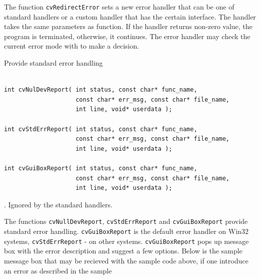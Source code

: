 \begin{description}
\end{description}

The function \texttt{cvRedirectError} sets a new error handler that
can be one of standard handlers or a custom handler
that has the certain interface. The handler takes the same parameters
as  function. If the handler returns non-zero value, the
program is terminated, otherwise, it continues. The error handler may
check the current error mode with  to make a decision.


\label{cvNulDevReport}
\label{cvStdErrReport}
\label{cvGuiBoxReport}

Provide standard error handling

\begin{lstlisting}

int cvNulDevReport( int status, const char* func_name,
                    const char* err_msg, const char* file_name,
                    int line, void* userdata );

int cvStdErrReport( int status, const char* func_name,
                    const char* err_msg, const char* file_name,
                    int line, void* userdata );

int cvGuiBoxReport( int status, const char* func_name,
                    const char* err_msg, const char* file_name,
                    int line, void* userdata );

\end{lstlisting}

\begin{description}
. Ignored by the standard handlers.
\end{description}

The functions \texttt{cvNullDevReport}, \texttt{cvStdErrReport}
and \texttt{cvGuiBoxReport} provide standard error
handling. \texttt{cvGuiBoxReport} is the default error
handler on Win32 systems, \texttt{cvStdErrReport} - on other
systems. \texttt{cvGuiBoxReport} pops up message box with the error
description and suggest a few options. Below is the sample message box
that may be recieved with the sample code above, if one introduce an
error as described in the sample

